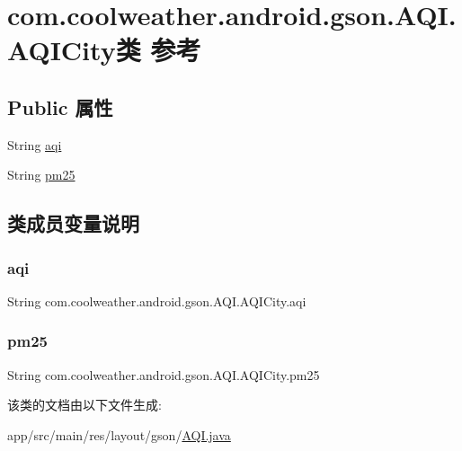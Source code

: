 \hypertarget{classcom_1_1coolweather_1_1android_1_1gson_1_1_a_q_i_1_1_a_q_i_city}{}\section{com.\+coolweather.\+android.\+gson.\+A\+Q\+I.\+A\+Q\+I\+City类 参考}
\label{classcom_1_1coolweather_1_1android_1_1gson_1_1_a_q_i_1_1_a_q_i_city}
\subsection*{Public 属性}
\begin{DoxyCompactItemize}
\item 
String \mbox{\hyperlink{classcom_1_1coolweather_1_1android_1_1gson_1_1_a_q_i_1_1_a_q_i_city_a2eba0e1aec3bb73df1dbbd830d320223}{aqi}}
\item 
String \mbox{\hyperlink{classcom_1_1coolweather_1_1android_1_1gson_1_1_a_q_i_1_1_a_q_i_city_a2922fe1c1eb893a465605ec2b8374f5c}{pm25}}
\end{DoxyCompactItemize}


\subsection{类成员变量说明}
\mbox{\label{classcom_1_1coolweather_1_1android_1_1gson_1_1_a_q_i_1_1_a_q_i_city_a2eba0e1aec3bb73df1dbbd830d320223}} 
\subsubsection{\texorpdfstring{aqi}{aqi}}
{\footnotesize\ttfamily String com.\+coolweather.\+android.\+gson.\+A\+Q\+I.\+A\+Q\+I\+City.\+aqi}

\mbox{\label{classcom_1_1coolweather_1_1android_1_1gson_1_1_a_q_i_1_1_a_q_i_city_a2922fe1c1eb893a465605ec2b8374f5c}} 
\subsubsection{\texorpdfstring{pm25}{pm25}}
{\footnotesize\ttfamily String com.\+coolweather.\+android.\+gson.\+A\+Q\+I.\+A\+Q\+I\+City.\+pm25}



该类的文档由以下文件生成\+:\begin{DoxyCompactItemize}
\item 
app/src/main/res/layout/gson/\mbox{\hyperlink{res_2layout_2gson_2_a_q_i_8java}{A\+Q\+I.\+java}}\end{DoxyCompactItemize}
